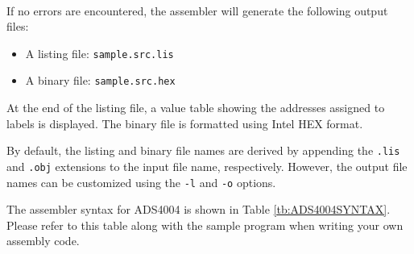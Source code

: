 \begin{scriptsize}
\end{scriptsize}
\\

If no errors are encountered, the assembler will generate the following output files:

\begin{itemize}
  \item A listing file: \texttt{sample.src.lis}
  \item A binary file: \texttt{sample.src.hex}
\end{itemize}

At the end of the listing file, a value table showing the addresses assigned to labels is displayed.  
The binary file is formatted using Intel HEX format.  

By default, the listing and binary file names are derived by appending the \texttt{.lis} and \texttt{.obj} extensions to the input file name, respectively.  
However, the output file names can be customized using the \texttt{-l} and \texttt{-o} options.

The assembler syntax for ADS4004 is shown in Table \ref{tb:ADS4004SYNTAX}.  
Please refer to this table along with the sample program when writing your own assembly code.


